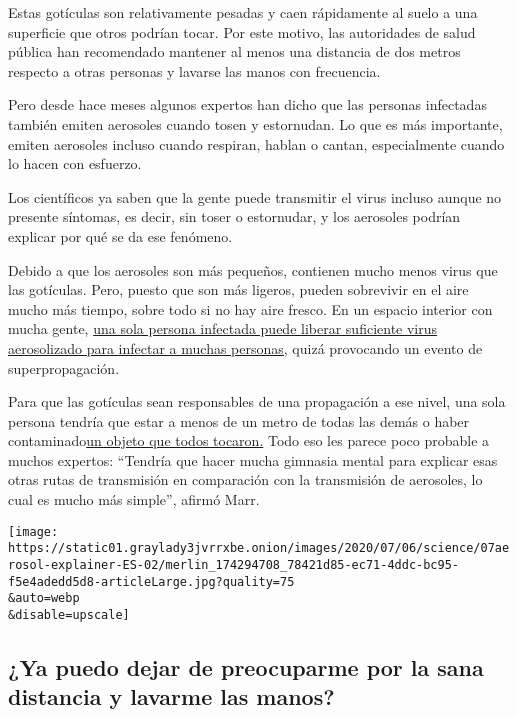 Estas gotículas son relativamente pesadas y caen rápidamente al suelo a
una superficie que otros podrían tocar. Por este motivo, las autoridades
de salud pública han recomendado mantener al menos una distancia de dos
metros respecto a otras personas y lavarse las manos con frecuencia.

Pero desde hace meses algunos expertos han dicho que las personas
infectadas también emiten aerosoles cuando tosen y estornudan. Lo que es
más importante, emiten aerosoles incluso cuando respiran, hablan o
cantan, especialmente cuando lo hacen con esfuerzo.

Los científicos ya saben que la gente puede transmitir el virus incluso
aunque no presente síntomas, es decir, sin toser o estornudar, y los
aerosoles podrían explicar por qué se da ese fenómeno.

Debido a que los aerosoles son más pequeños, contienen mucho menos virus
que las gotículas. Pero, puesto que son más ligeros, pueden sobrevivir
en el aire mucho más tiempo, sobre todo si no hay aire fresco. En un
espacio interior con mucha gente,
\href{https://www.nytimes3xbfgragh.onion/es/2020/07/03/espanol/el-misterio-de-los-superpropagadores-de-coronavirus.html}{una
sola persona infectada puede liberar suficiente virus aerosolizado para
infectar a muchas personas,} quizá provocando un evento de
superpropagación.

Para que las gotículas sean responsables de una propagación a ese nivel,
una sola persona tendría que estar a menos de un metro de todas las
demás o haber
contaminado\href{https://www.nytimes3xbfgragh.onion/2020/05/28/well/live/whats-the-risk-of-catching-coronavirus-from-a-surface.html}{un
objeto que todos tocaron.} Todo eso les parece poco probable a muchos
expertos: ``Tendría que hacer mucha gimnasia mental para explicar esas
otras rutas de transmisión en comparación con la transmisión de
aerosoles, lo cual es mucho más simple'', afirmó Marr.

\texttt{[image: https://static01.graylady3jvrrxbe.onion/images/2020/07/06/science/07aerosol-explainer-ES-02/merlin\_174294708\_78421d85-ec71-4ddc-bc95-f5e4adedd5d8-articleLarge.jpg?quality=75\\\&auto=webp\\\&disable=upscale]}

\hypertarget{ya-puedo-dejar-de-preocuparme-por-la-sana-distancia-y-lavarme-las-manos}{%
\subsection{¿Ya puedo dejar de preocuparme por la sana distancia y
lavarme las
manos?}\label{ya-puedo-dejar-de-preocuparme-por-la-sana-distancia-y-lavarme-las-manos}}


